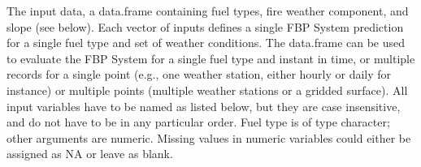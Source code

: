 \documentclass[a4paper]{book}
\begin{document}
\begin{Arguments}
\begin{ldescription}
\item[\code{input}] The input data, a data.frame containing fuel types, fire
weather component, and slope (see below). Each vector of inputs defines a
single FBP System prediction for a single fuel type and set of weather
conditions. The data.frame can be used to evaluate the FBP System for a
single fuel type and instant in time, or multiple records for a single point
(e.g., one weather station, either hourly or daily for instance) or multiple
points (multiple weather stations or a gridded surface). All input variables
have to be named as listed below, but they are case insensitive, and do not
have to be in any particular order. Fuel type is of type character; other
arguments are numeric. Missing values in numeric variables could either be
assigned as NA or leave as blank.\\{}\\{}



\end{ldescription}
\end{Arguments}
\end{document}
